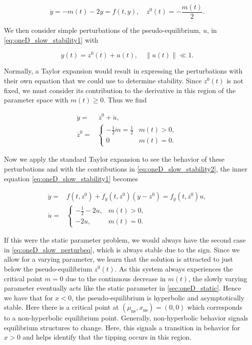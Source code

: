 \begin{equation}\label{eq:oneD_slow_stability1}
\dot{y}=-m(t)-2y=f(t,y), \quad z^0(t)=-\frac{m(t)}{2}.
\end{equation}

We then consider simple perturbations of the pseudo-equilibrium, $u$, in \eqref{eq:oneD_slow_stability1} with

\begin{equation*}
y(t)=z^0(t)+u(t), \quad \lVert u(t) \rVert \ll 1.
\end{equation*}

\indent Normally, a Taylor expansion would result in expressing the perturbations with their own equation that we could use to determine stability. Since $z^0(t)$ is not fixed, we must consider its contribution to the derivative in this region of the parameter space with $m(t)\ge 0$. Thus we find

\begin{equation}\label{eq:oneD_slow_stability2}
\begin{aligned}
\dot{y} =& \,\dot{z}^0+\dot{u},\\
\dot{z}^0= & \begin{cases}
-\frac{1}{2}\dot{m}=\frac{1}{2} & m(t)>0,\\
0 & m(t)=0.
\end{cases}
\end{aligned}
\end{equation}

Now we apply the standard Taylor expansion to see the behavior of these perturbations and with the contributions in \eqref{eq:oneD_slow_stability2}, the inner equation \eqref{eq:oneD_slow_stability1} becomes

\begin{equation}\label{eq:oneD_slow_perturbeq}
\begin{aligned}
\dot{y}=& f(t,z^0)+f_y(t,z^0)(y-z^0)
= f_y(t,z^0)u,\\
\dot{u}=&\begin{cases}
-\frac{1}{2}-2u, & m(t)>0,\\
-2u, & m(t)=0.
\end{cases}
\end{aligned}
\end{equation}

\indent If this were the static parameter problem, we would always have the second case in \eqref{eq:oneD_slow_perturbeq}, which is always stable due to the sign. Since we allow for a varying parameter, we learn that the solution is attracted to just below the pseudo-equilibrium $z^0(t)$. As this system always experiences the critical point $m=0$ due to the continuous decrease in $m(t)$, the slowly varying parameter eventually acts like the static parameter in \autoref{sec:oneD_static}. Hence we have that for $x<0$, the pseudo-equilibrium is hyperbolic and asymptotically stable. Here there is a critical point at $(\mu_{\text{ns}},x_{\text{ns}})=(0,0)$ which corresponds to a non-hyperbolic equilibrium point. Generally, non-hyperbolic behavior signals equilibrium structures to change. Here, this signals a transition in behavior for $x>0$ and helps identify that the tipping occurs in this region.

